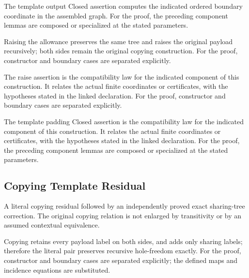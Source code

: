 The template output Closed assertion computes the indicated ordered boundary coordinate in the assembled graph.
For the proof, the preceding component lemmas are composed or specialized at the stated parameters.
\par{}

Raising the allowance preserves the same tree and raises the original payload recursively; both sides remain the original copying construction.
For the proof, constructor and boundary cases are separated explicitly.
\par{}

The raise assertion is the compatibility law for the indicated component of this construction. It relates the actual finite coordinates or certificates, with the hypotheses stated in the linked declaration.
For the proof, constructor and boundary cases are separated explicitly.
\par{}

The template padding Closed assertion is the compatibility law for the indicated component of this construction. It relates the actual finite coordinates or certificates, with the hypotheses stated in the linked declaration.
For the proof, the preceding component lemmas are composed or specialized at the stated parameters.
\par{}

\subsection{Copying Template Residual}
A literal copying residual followed by an independently proved exact sharing-tree correction. The original copying relation is not enlarged by transitivity or by an assumed contextual equivalence.

Copying retains every payload label on both sides, and adds only sharing labels; therefore the literal pair preserves recursive hole-freedom exactly.
For the proof, constructor and boundary cases are separated explicitly; the defined maps and incidence equations are substituted.
\par{}

